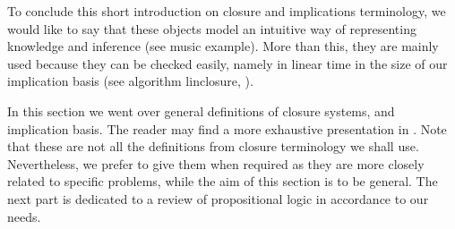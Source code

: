 \vspace{1.2em}

To conclude this short introduction on closure and implications terminology, we 
would like to say that these objects model an intuitive way of representing
knowledge and inference (see music example). More than this, they are mainly 
used because they can be checked easily, namely in linear time in the size of
our implication basis (see algorithm linclosure,  
\cite{b._ganter_conceptual_2016, david_minimum_1980,maier_theory_1983}).

	In this section we went over general definitions of closure systems, and 
implication basis. The reader may find a more exhaustive presentation in 
\cite{b._ganter_conceptual_2016, davey_introduction_2002}. Note that these are 
not all the definitions from closure terminology we shall use. Nevertheless, we 
prefer to give them when required as they are more closely related to specific 
problems, while the aim of this section is to be general. The next part is 
dedicated to a review of propositional logic in accordance to our needs.









